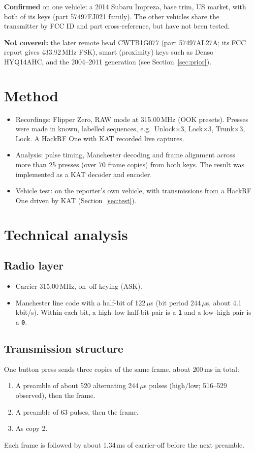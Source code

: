 \documentclass[11pt,a4paper]{article}
\newcommand{\us}{\,$\mu$s}
\begin{document}
\noindent\textbf{Confirmed} on one vehicle: a 2014 Subaru Impreza, base trim, US market, with both of its keys (part 57497FJ021 family). The other vehicles share the transmitter by FCC ID and part cross-reference, but have not been tested.

\noindent\textbf{Not covered:} the later remote head CWTB1G077 (part 57497AL27A; its FCC report gives 433.92\,MHz FSK), smart (proximity) keys such as Denso HYQ14AHC, and the 2004--2011 generation (see Section~\ref{sec:prior}).

\section{Method}
\begin{itemize}
\item Recordings: Flipper Zero, RAW mode at 315.00\,MHz (OOK presets). Presses were made in known, labelled sequences, e.g.\ Unlock$\times$3, Lock$\times$3, Trunk$\times$3, Lock. A HackRF One with KAT recorded live captures.
\item Analysis: pulse timing, Manchester decoding and frame alignment across more than 25 presses (over 70 frame copies) from both keys. The result was implemented as a KAT decoder and encoder.
\item Vehicle test: on the reporter's own vehicle, with transmissions from a HackRF One driven by KAT (Section~\ref{sec:test}).
\end{itemize}

\section{Technical analysis}
\subsection{Radio layer}
\begin{itemize}
\item Carrier 315.00\,MHz, on--off keying (ASK).
\item Manchester line code with a half-bit of 122\us{} (bit period 244\us, about 4.1\,kbit/s). Within each bit, a high--low half-bit pair is a \texttt{1} and a low--high pair is a \texttt{0}.
\end{itemize}

\subsection{Transmission structure}
One button press sends three copies of the same frame, about 200\,ms in total:
\begin{enumerate}
\item A preamble of about 520 alternating 244\us{} pulses (high/low; 516--529 observed), then the frame.
\item A preamble of 63 pulses, then the frame.
\item As copy 2.
\end{enumerate}
Each frame is followed by about 1.34\,ms of carrier-off before the next preamble.
\end{document}
